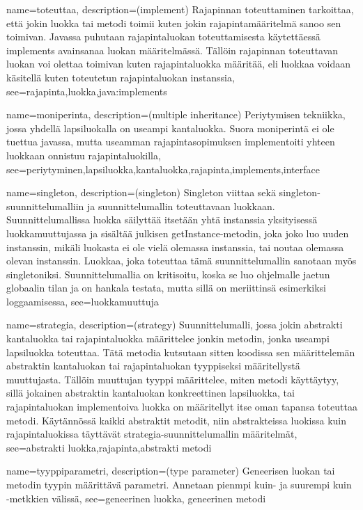 {
	name=toteuttaa,
	description={(implement) Rajapinnan toteuttaminen tarkoittaa, että jokin luokka tai metodi
toimii kuten jokin rajapintamääritelmä sanoo sen toimivan. Javassa puhutaan rajapintaluokan
toteuttamisesta käytettäessä implements avainsanaa luokan määritelmässä. Tällöin rajapinnan
toteuttavan luokan voi olettaa toimivan kuten rajapintaluokka määritää, eli luokkaa voidaan
käsitellä kuten toteutetun rajapintaluokan instanssia},
	see={rajapinta,luokka,java:implements}
}

{
	name=moniperinta,
	description={(multiple inheritance) Periytymisen tekniikka, jossa yhdellä lapsiluokalla on
useampi kantaluokka. Suora moniperintä ei ole tuettua javassa, mutta useamman rajapintasopimuksen
implementoiti yhteen luokkaan onnistuu rajapintaluokilla},
	see={periytyminen,lapsiluokka,kantaluokka,rajapinta,implements,interface}
}

{
	name=singleton,
	description={(singleton) Singleton viittaa sekä singleton-suunnittelumalliin ja
suunnittelumallin toteuttavaan luokkaan. Suunnittelumallissa luokka säilyttää itsetään yhtä
instanssia yksityisessä luokkamuuttujassa ja sisältää julkisen getInstance-metodin, joka joko luo
uuden instanssin, mikäli luokasta ei ole vielä olemassa instanssia, tai noutaa olemassa olevan
instanssin. Luokkaa, joka toteuttaa tämä suunnittelumallin sanotaan myös singletoniksi.
Suunnittelumallia on kritisoitu, koska se luo ohjelmalle jaetun globaalin tilan ja on hankala
testata, mutta sillä on meriittinsä esimerkiksi loggaamisessa},
	see=luokkamuuttuja
}

{
	name=strategia,
	description={(strategy) Suunnittelumalli, jossa jokin abstrakti kantaluokka tai
rajapintaluokka määrittelee jonkin metodin, jonka useampi lapsiluokka toteuttaa. Tätä metodia
kutsutaan sitten koodissa sen määrittelemän abstraktin kantaluokan tai rajapintaluokan tyyppiseksi
määritellystä muuttujasta. Tällöin muuttujan tyyppi määrittelee, miten metodi käyttäytyy, sillä
jokainen abstraktin kantaluokan konkreettinen lapsiluokka, tai rajapintaluokan implementoiva
luokka on määritellyt itse oman tapansa toteuttaa metodi. Käytännössä kaikki abstraktit metodit,
niin abstrakteissa luokissa kuin rajapintaluokissa täyttävät strategia-suunnittelumallin
määritelmät},
	see={abstrakti luokka,rajapinta,abstrakti metodi}
}

{
	name=tyyppiparametri,
	description={(type parameter) Geneerisen luokan tai metodin tyypin määrittävä parametri.
Annetaan pienmpi kuin- ja suurempi kuin -metkkien välissä},
	see={geneerinen luokka, geneerinen metodi}
}

